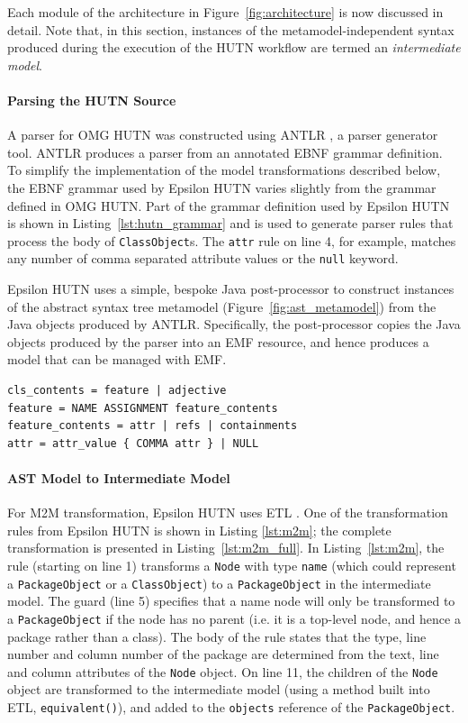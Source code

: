 Each module of the architecture in Figure~\ref{fig:architecture} is now discussed in detail. Note that, in this section, instances of the metamodel-independent syntax produced during the execution of the HUTN workflow are termed an \textit{intermediate model}.

\paragraph{Parsing the HUTN Source}
A parser for OMG HUTN was constructed using ANTLR \cite{parr07antlr}, a parser generator tool. ANTLR produces a parser from an annotated EBNF grammar definition. To simplify the implementation of the model transformations described below, the EBNF grammar used by Epsilon HUTN varies slightly from the grammar defined in OMG HUTN. Part of the grammar definition used by Epsilon HUTN is shown in Listing~\ref{lst:hutn_grammar} and is used to generate parser rules that process the body of \texttt{Cl\-a\-ssOb\-je\-ct}s. The \texttt{attr} rule on line 4, for example, matches any number of comma separated attribute values or the \texttt{null} keyword.

Epsilon HUTN uses a simple, bespoke Java post-processor to construct instances of the abstract syntax tree metamodel (Figure~\ref{fig:ast_metamodel}) from the Java objects produced by ANTLR. Specifically, the post-processor copies the Java objects produced by the parser into an EMF resource, and hence produces a model that can be managed with EMF.

\begin{lstlisting}[caption=An extract of the Epsilon HUTN grammar definition in EBNF, label=lst:hutn_grammar, language=EBNF]
cls_contents = feature | adjective
feature = NAME ASSIGNMENT feature_contents
feature_contents = attr | refs | containments
attr = attr_value { COMMA attr } | NULL
\end{lstlisting}

\paragraph{AST Model to Intermediate Model}
For M2M transformation, Epsilon HUTN uses ETL \cite{kolovos08etl}. One of the transformation rules from Epsilon HUTN is shown in Listing \ref{lst:m2m}; the complete transformation is presented in Listing~\ref{lst:m2m_full}. In Listing~\ref{lst:m2m}, the rule (starting on line 1) transforms a \texttt{No\-de} with type \texttt{na\-me} (which could represent a \texttt{P\-ac\-ka\-geOb\-je\-ct} or a \texttt{Cl\-a\-ssOb\-je\-ct}) to a \texttt{P\-ac\-ka\-geOb\-je\-ct} in the intermediate model. The guard (line 5) specifies that a name node will only be transformed to a \texttt{P\-ac\-ka\-geOb\-je\-ct} if the node has no parent (i.e. it is a top-level node, and hence a package rather than a class). The body of the rule states that the type, line number and column number of the package are determined from the text, line and column attributes of the \texttt{No\-de} object. On line 11, the children of the \texttt{No\-de} object are transformed to the intermediate model (using a method built into ETL, \texttt{eq\-ui\-va\-lent()}), and added to the \texttt{ob\-je\-c\-ts} reference of the \texttt{P\-ac\-ka\-geOb\-je\-ct}.

